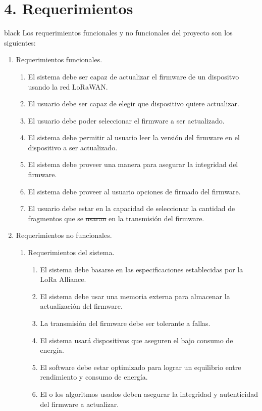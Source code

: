 \documentclass[11pt]{charter}
\providecommand{\DIFadd}[1]{{\protect\color{blue}\uwave{#1}}} %
\providecommand{\DIFdel}[1]{{\protect\color{red}\sout{#1}}}                      %
\providecommand{\DIFaddbegin}{} %
\providecommand{\DIFaddend}{} %
\providecommand{\DIFdelbegin}{} %
\providecommand{\DIFdelend}{} %
\begin{document}
\section{4. Requerimientos}
\label{sec:requerimientos}
\begin{consigna}{black}
Los requerimientos funcionales y no funcionales del proyecto son los siguientes:
\begin{enumerate}
\item Requerimientos funcionales.
	\begin{enumerate}
	\item El sistema debe ser capaz de actualizar el firmware de un dispositvo usando la red LoRaWAN.
	\item El usuario debe ser capaz de elegir que dispositivo quiere actualizar.
	\item El usuario debe poder seleccionar el firmware a ser actualizado.
	\item El sistema debe permitir al usuario leer la versión del firmware en el dispositivo a ser actualizado.
	\item El sistema debe proveer una manera para asegurar la integridad del firmware.
	\item El sistema debe proveer al usuario opciones de firmado del firmware.
	\item El usuario debe estar en la capacidad de seleccionar la cantidad de fragmentos que se \DIFdelbegin \DIFdel{usaran }\DIFdelend \DIFaddbegin \DIFadd{usarán }\DIFaddend en la transmisión del firmware.
	\end{enumerate}
\item Requerimientos no funcionales.
	\begin{enumerate}
	\item Requerimientos del sistema.
	\begin{enumerate}
		\item El sistema debe basarse en las especificaciones establecidas por la LoRa Alliance\textregistered.
		\item El sistema debe usar una memoria externa para almacenar la actualización del firmware.
		\item La transmisión del firmware debe ser tolerante a fallas.
		\item El sistema usará dispositivos que aseguren el bajo consumo de energía.
		\item El software debe estar optimizado para lograr un equilibrio entre rendimiento y consumo de energía.
		\item El o los algoritmos usados deben asegurar la integridad y autenticidad del firmware a actualizar.

\end{enumerate}
\end{enumerate}
\end{enumerate}
\end{consigna}
\end{document}

